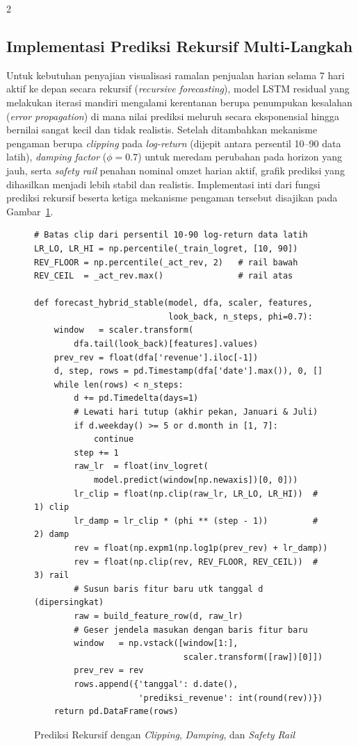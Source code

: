 \documentclass[12pt, a4paper, onecolumn, oneside]{report}
\begin{document}
\begin{spacing}{2}
\subsection{Implementasi Prediksi Rekursif Multi-Langkah}

Untuk kebutuhan penyajian visualisasi ramalan penjualan harian selama 7 hari aktif ke depan secara rekursif (\textit{recursive forecasting}), model LSTM residual yang melakukan iterasi mandiri mengalami kerentanan berupa penumpukan kesalahan (\textit{error propagation}) di mana nilai prediksi meluruh secara eksponensial hingga bernilai sangat kecil dan tidak realistis. Setelah ditambahkan mekanisme pengaman berupa \textit{clipping} pada \textit{log-return} (dijepit antara persentil 10--90 data latih), \textit{damping factor} ($\phi = 0.7$) untuk meredam perubahan pada horizon yang jauh, serta \textit{safety rail} penahan nominal omzet harian aktif, grafik prediksi yang dihasilkan menjadi lebih stabil dan realistis. Implementasi inti dari fungsi prediksi rekursif beserta ketiga mekanisme pengaman tersebut disajikan pada Gambar~\ref{fig:recursive}.

\begin{figure}[H]
\begin{lstlisting}
# Batas clip dari persentil 10-90 log-return data latih
LR_LO, LR_HI = np.percentile(_train_logret, [10, 90])
REV_FLOOR = np.percentile(_act_rev, 2)   # rail bawah
REV_CEIL  = _act_rev.max()               # rail atas

def forecast_hybrid_stable(model, dfa, scaler, features,
                           look_back, n_steps, phi=0.7):
    window   = scaler.transform(
        dfa.tail(look_back)[features].values)
    prev_rev = float(dfa['revenue'].iloc[-1])
    d, step, rows = pd.Timestamp(dfa['date'].max()), 0, []
    while len(rows) < n_steps:
        d += pd.Timedelta(days=1)
        # Lewati hari tutup (akhir pekan, Januari & Juli)
        if d.weekday() >= 5 or d.month in [1, 7]:
            continue
        step += 1
        raw_lr  = float(inv_logret(
            model.predict(window[np.newaxis])[0, 0]))
        lr_clip = float(np.clip(raw_lr, LR_LO, LR_HI))  # 1) clip
        lr_damp = lr_clip * (phi ** (step - 1))         # 2) damp
        rev = float(np.expm1(np.log1p(prev_rev) + lr_damp))
        rev = float(np.clip(rev, REV_FLOOR, REV_CEIL))  # 3) rail
        # Susun baris fitur baru utk tanggal d (dipersingkat)
        raw = build_feature_row(d, raw_lr)
        # Geser jendela masukan dengan baris fitur baru
        window   = np.vstack([window[1:],
                              scaler.transform([raw])[0]])
        prev_rev = rev
        rows.append({'tanggal': d.date(),
                     'prediksi_revenue': int(round(rev))})
    return pd.DataFrame(rows)
\end{lstlisting}
\caption{Prediksi Rekursif dengan \textit{Clipping}, \textit{Damping}, dan \textit{Safety Rail}}
\label{fig:recursive}
\end{figure}


\end{spacing}
\end{document}
